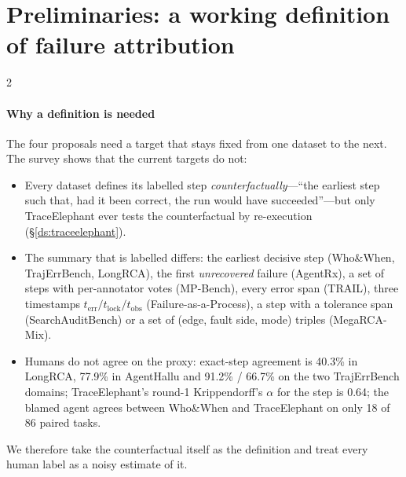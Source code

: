 \section{Preliminaries: a working definition of failure attribution}\label{sec:future:prelim}

\begin{multicols}{2}
\paragraph{Why a definition is needed} The four proposals need a target that stays fixed from one dataset to the next. The survey shows that the current targets do not:
\begin{itemize}[leftmargin=1.1em]
\item Every dataset defines its labelled step \emph{counterfactually}---``the earliest step such that, had it been correct, the run would have succeeded''---but only TraceElephant ever tests the counterfactual by re-execution (\S\ref{ds:traceelephant}).
\item The summary that is labelled differs: the earliest decisive step (Who\&When, TrajErrBench, LongRCA), the first \emph{unrecovered} failure (AgentRx), a set of steps with per-annotator votes (MP-Bench), every error span (TRAIL), three timestamps $t_{\mathrm{err}}/t_{\mathrm{lock}}/t_{\mathrm{obs}}$ (Failure-as-a-Process), a step with a tolerance span (SearchAuditBench) or a set of (edge, fault side, mode) triples (MegaRCA-Mix).
\item Humans do not agree on the proxy: exact-step agreement is 40.3\% in LongRCA, 77.9\% in AgentHallu and 91.2\% / 66.7\% on the two TrajErrBench domains; TraceElephant's round-1 Krippendorff's $\alpha$ for the step is 0.64; the blamed agent agrees between Who\&When and TraceElephant on only 18 of 86 paired tasks.
\end{itemize}
We therefore take the counterfactual itself as the definition and treat every human label as a noisy estimate of it.


\end{multicols}
